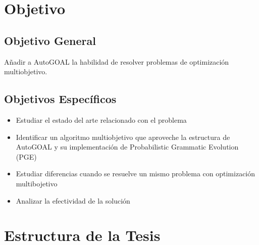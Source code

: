 
\section*{Objetivo}
\subsection*{Objetivo General}
Añadir a AutoGOAL la habilidad de resolver problemas de optimizaci\'on multiobjetivo.
\subsection*{Objetivos Espec\'ificos}
\begin{itemize}
    \item Estudiar el estado del arte relacionado con el problema
    \item Identificar un algoritmo multiobjetivo que aproveche la estructura de AutoGOAL y su implementaci\'on de Probabilistic Grammatic Evolution (PGE)
    \item Estudiar diferencias cuando se resuelve un mismo problema con optimizaci\'on multibojetivo
    \item Analizar la efectividad de la soluci\'on
\end{itemize}

\section*{Estructura de la Tesis}
